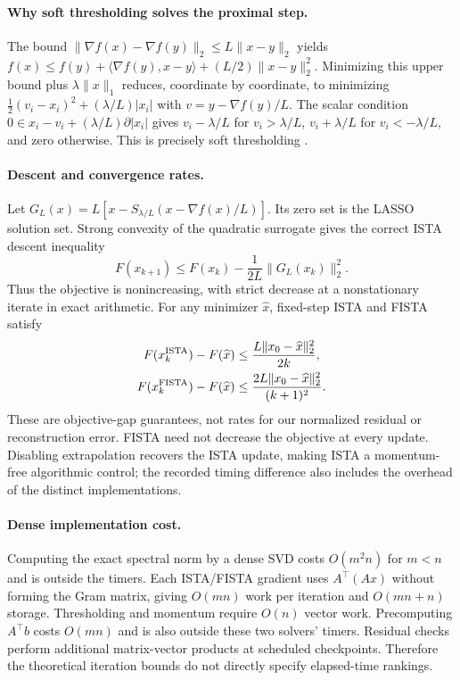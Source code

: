 \documentclass{article}
\begin{document}
\paragraph{Why soft thresholding solves the proximal step.}
The bound $\|\nabla f(x)-\nabla f(y)\|_2\le L\|x-y\|_2$ yields
$f(x)\le f(y)+\langle\nabla f(y),x-y\rangle+(L/2)\|x-y\|_2^2$.
Minimizing this upper bound plus $\lambda\|x\|_1$ reduces, coordinate by coordinate, to minimizing
$\frac12(v_i-x_i)^2+(\lambda/L)|x_i|$ with $v=y-\nabla f(y)/L$.
The scalar condition $0\in x_i-v_i+(\lambda/L)\partial|x_i|$ gives $v_i-\lambda/L$ for $v_i>\lambda/L$, $v_i+\lambda/L$ for $v_i<-\lambda/L$, and zero otherwise. This is precisely soft thresholding \citep{parikh2014}.

\paragraph{Descent and convergence rates.}
Let $G_L(x)=L[x-S_{\lambda/L}(x-\nabla f(x)/L)]$. Its zero set is the LASSO solution set. Strong convexity of the quadratic surrogate gives the correct ISTA descent inequality
\begin{equation}
F(x_{k+1})\le F(x_k)-\frac{1}{2L}\|G_L(x_k)\|_2^2.
\end{equation}
Thus the objective is nonincreasing, with strict decrease at a nonstationary iterate in exact arithmetic. For any minimizer $\widehat x$, fixed-step ISTA and FISTA satisfy \citep{beck2009}
\begin{align}
F(x_k^{\rm ISTA})-F(\widehat x)&\le\frac{L\|x_0-\widehat x\|_2^2}{2k},\\
F(x_k^{\rm FISTA})-F(\widehat x)&\le\frac{2L\|x_0-\widehat x\|_2^2}{(k+1)^2}.
\end{align}
These are objective-gap guarantees, not rates for our normalized residual or reconstruction error. FISTA need not decrease the objective at every update. Disabling extrapolation recovers the ISTA update, making ISTA a momentum-free algorithmic control; the recorded timing difference also includes the overhead of the distinct implementations.

\paragraph{Dense implementation cost.}
Computing the exact spectral norm by a dense SVD costs $O(m^2n)$ for $m<n$ and is outside the timers. Each ISTA/FISTA gradient uses $A^\top(Ax)$ without forming the Gram matrix, giving $O(mn)$ work per iteration and $O(mn+n)$ storage. Thresholding and momentum require $O(n)$ vector work. Precomputing $A^\top b$ costs $O(mn)$ and is also outside these two solvers' timers. Residual checks perform additional matrix-vector products at scheduled checkpoints. Therefore the theoretical iteration bounds do not directly specify elapsed-time rankings.
\end{document}
